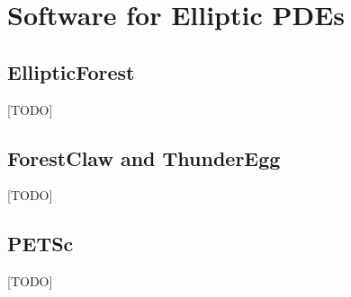 \section{Software for Elliptic PDEs}

\subsection{EllipticForest}

[TODO]

\subsection{ForestClaw and ThunderEgg}

[TODO]

\subsection{PETSc}

[TODO]